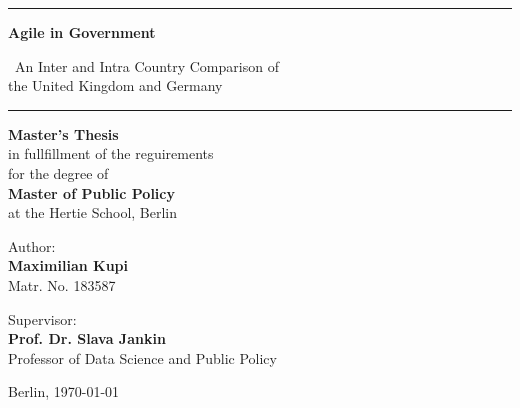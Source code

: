 \begin{titlepage}
\begin{center}
\vspace*{2cm}
	\hrule
	\vspace{1cm}
	{\huge\bfseries Agile in Government}\\ 
	\vspace{0.3cm}
	{\LARGE \ An Inter and Intra Country Comparison of \\the United Kingdom and Germany\par}
	\vspace{1cm}
	\hrule \vspace{1cm}
%
\vspace{1cm}
    {\normalsize 
   	\textbf{Master's Thesis} \\\vspace{0.5cm}
   	in fullfillment of the reguirements\\
    for the degree of \\\vspace{0.5cm}
   	{\bf Master of Public Policy}\\\vspace{0.5cm}
   	{ at the Hertie School, Berlin}}
   	
\vspace{2cm}


\begin{minipage}[t]{0.4\textwidth}
	\begin{flushleft} \large
		\normalsize{Author:\\
			\bf{Maximilian Kupi}}\\
			{Matr. No. 183587}
	\end{flushleft}
\end{minipage}
\begin{minipage}[t]{0.4\textwidth}
	\begin{flushright} \large
		\normalsize{Supervisor:\\
		\bf{Prof. Dr. Slava Jankin}}\\
		{Professor of Data Science and Public Policy}
	\end{flushright}
\end{minipage}\vspace{1cm}

\end{center}
\vspace{2cm}
\begin{center}

	Berlin, \today
\end{center}


\end{titlepage}